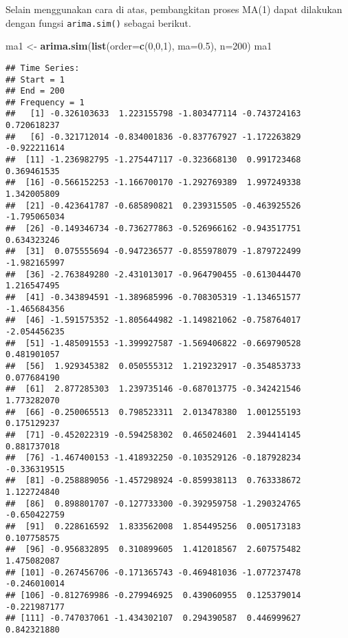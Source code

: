 \documentclass[
]{article}
\newenvironment{Shaded}{\begin{snugshade}}{\end{snugshade}}
\newcommand{\AttributeTok}[1]{\textcolor[rgb]{0.13,0.29,0.53}{#1}}
\newcommand{\DecValTok}[1]{\textcolor[rgb]{0.00,0.00,0.81}{#1}}
\newcommand{\FloatTok}[1]{\textcolor[rgb]{0.00,0.00,0.81}{#1}}
\newcommand{\FunctionTok}[1]{\textcolor[rgb]{0.13,0.29,0.53}{\textbf{#1}}}
\newcommand{\NormalTok}[1]{#1}
\newcommand{\OtherTok}[1]{\textcolor[rgb]{0.56,0.35,0.01}{#1}}
\begin{document}
Selain menggunakan cara di atas, pembangkitan proses MA(1) dapat
dilakukan dengan fungsi \texttt{arima.sim()} sebagai berikut.

\begin{Shaded}
\begin{Highlighting}[]
\NormalTok{ma1 }\OtherTok{\textless{}{-}} \FunctionTok{arima.sim}\NormalTok{(}\FunctionTok{list}\NormalTok{(}\AttributeTok{order=}\FunctionTok{c}\NormalTok{(}\DecValTok{0}\NormalTok{,}\DecValTok{0}\NormalTok{,}\DecValTok{1}\NormalTok{), }\AttributeTok{ma=}\FloatTok{0.5}\NormalTok{), }\AttributeTok{n=}\DecValTok{200}\NormalTok{)}
\NormalTok{ma1}
\end{Highlighting}
\end{Shaded}

\begin{verbatim}
## Time Series:
## Start = 1 
## End = 200 
## Frequency = 1 
##   [1] -0.326103633  1.223155798 -1.803477114 -0.743724163  0.720618237
##   [6] -0.321712014 -0.834001836 -0.837767927 -1.172263829 -0.922211614
##  [11] -1.236982795 -1.275447117 -0.323668130  0.991723468  0.369461535
##  [16] -0.566152253 -1.166700170 -1.292769389  1.997249338  1.342005809
##  [21] -0.423641787 -0.685890821  0.239315505 -0.463925526 -1.795065034
##  [26] -0.149346734 -0.736277863 -0.526966162 -0.943517751  0.634323246
##  [31]  0.075555694 -0.947236577 -0.855978079 -1.879722499 -1.982165997
##  [36] -2.763849280 -2.431013017 -0.964790455 -0.613044470  1.216547495
##  [41] -0.343894591 -1.389685996 -0.708305319 -1.134651577 -1.465684356
##  [46] -1.591575352 -1.805644982 -1.149821062 -0.758764017 -2.054456235
##  [51] -1.485091553 -1.399927587 -1.569406822 -0.669790528  0.481901057
##  [56]  1.929345382  0.050555312  1.219232917 -0.354853733  0.077684190
##  [61]  2.877285303  1.239735146 -0.687013775 -0.342421546  1.773282070
##  [66] -0.250065513  0.798523311  2.013478380  1.001255193  0.175129237
##  [71] -0.452022319 -0.594258302  0.465024601  2.394414145  0.881737018
##  [76] -1.467400153 -1.418932250 -0.103529126 -0.187928234 -0.336319515
##  [81] -0.258889056 -1.457298924 -0.859938113  0.763338672  1.122724840
##  [86]  0.898801707 -0.127733300 -0.392959758 -1.290324765 -0.650422759
##  [91]  0.228616592  1.833562008  1.854495256  0.005173183  0.107758575
##  [96] -0.956832895  0.310899605  1.412018567  2.607575482  1.475082087
## [101] -0.267456706 -0.171365743 -0.469481036 -1.077237478 -0.246010014
## [106] -0.812769986 -0.279946925  0.439060955  0.125379014 -0.221987177
## [111] -0.747037061 -1.434302107  0.294390587  0.446999627  0.842321880

\end{verbatim}
\end{document}
